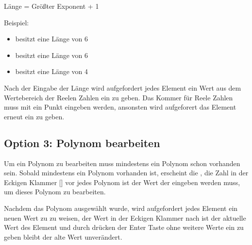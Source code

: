 \documentclass[letterpaper,10pt,ngerman]{sphinxmanual}
\begin{document}
\begin{DUlineblock}{0em}
\item[] Länge = Größter Exponent + 1
\end{DUlineblock}

\begin{DUlineblock}{0em}
\item[] Beispiel:
\end{DUlineblock}
\begin{itemize}
\item {} 
 besitzt eine Länge von 6

\item {} 
 besitzt eine Länge von 6

\item {} 
 besitzt eine Länge von 4

\end{itemize}

Nach der Eingabe der Länge wird aufgefordert jedes Element ein Wert aus dem Wertebereich der Reelen Zahlen
ein zu geben. Das Kommer für Reele Zahlen muss mit ein Punkt eingeben werden, ansonsten wird aufgeforert
das Element erneut ein zu geben.



\subsection{Option 3: Polynom bearbeiten}
\label{menu:option-3-polynom-bearbeiten}
Um ein Polynom zu bearbeiten muss mindestens ein Polynom schon vorhanden sein. Sobald mindestens ein
Polynom vorhanden ist, erscheint die , die Zahl in der Eckigen Klammer {[}{]} vor jedes
Polynom ist der Wert der eingeben werden muss, um dieses Polynom zu bearbeiten.

Nachdem das Polynom ausgewählt wurde, wird aufgefordert jedes Element ein neuen Wert zu zu weisen,
der Wert in der Eckigen Klammer nach  ist der aktuelle Wert des Element und durch drücken
der Enter Taste ohne weitere Werte ein zu geben bleibt der alte Wert unverändert.
\end{document}
